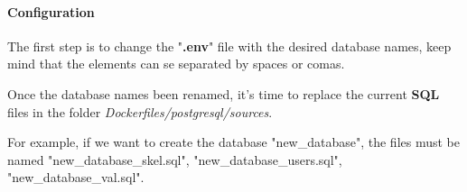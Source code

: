 \paragraph{Configuration}
\begin{flushleft}
    The first step is to change the "\textbf{.env}" file with the desired database names, keep mind that the elements
    can se separated by spaces or comas.
    
    Once the database names been renamed, it's time to replace the current \textbf{SQL} files in the folder
    \textit{Dockerfiles/postgresql/sources}.
\end{flushleft}

\begin{flushleft}
    For example, if we want to create the database "new\_database", the files must be named "new\_database\_skel.sql",
    "new\_database\_users.sql", "new\_database\_val.sql".
\end{flushleft}
